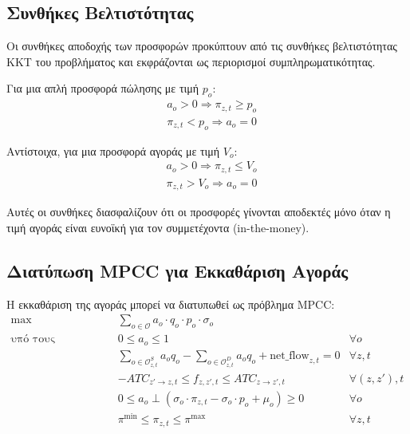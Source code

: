 \subsection{Συνθήκες Βελτιστότητας}
\label{subsec:euphemia-optimality}

Οι συνθήκες αποδοχής των προσφορών προκύπτουν από τις συνθήκες βελτιστότητας KKT του προβλήματος και εκφράζονται ως περιορισμοί συμπληρωματικότητας.

Για μια απλή προσφορά πώλησης με τιμή $p_o$:
\begin{equation}
\label{eq:supply-acceptance}
\begin{aligned}
& a_o > 0 \Rightarrow \pi_{z,t} \geq p_o \\
& \pi_{z,t} < p_o \Rightarrow a_o = 0
\end{aligned}
\end{equation}

Αντίστοιχα, για μια προσφορά αγοράς με τιμή $V_o$:
\begin{equation}
\label{eq:demand-acceptance}
\begin{aligned}
& a_o > 0 \Rightarrow \pi_{z,t} \leq V_o \\
& \pi_{z,t} > V_o \Rightarrow a_o = 0
\end{aligned}
\end{equation}

Αυτές οι συνθήκες διασφαλίζουν ότι οι προσφορές γίνονται αποδεκτές μόνο όταν η τιμή αγοράς είναι ευνοϊκή για τον συμμετέχοντα (in-the-money).

\subsection{Διατύπωση MPCC για Εκκαθάριση Αγοράς}
\label{subsec:euphemia-mpcc-formulation}

Η εκκαθάριση της αγοράς μπορεί να διατυπωθεί ως πρόβλημα MPCC:
\begin{equation}
\label{eq:market-clearing-mpcc}
\begin{aligned}
\max \quad & \sum_{o \in \mathcal{O}} a_o \cdot q_o \cdot p_o \cdot \sigma_o \\
\text{υπό τους περιορισμούς:} \quad
& 0 \leq a_o \leq 1 & \forall o \\
& \sum_{o \in \mathcal{O}_{z,t}^S} a_o q_o - \sum_{o \in \mathcal{O}_{z,t}^D} a_o q_o + \text{net\_flow}_{z,t} = 0 & \forall z, t \\
& -ATC_{z' \rightarrow z, t} \leq f_{z, z', t} \leq ATC_{z \rightarrow z', t} & \forall (z, z'), t \\
& 0 \leq a_o \perp (\sigma_o \cdot \pi_{z,t} - \sigma_o \cdot p_o + \mu_o) \geq 0 & \forall o \\
& \pi^{\min} \leq \pi_{z,t} \leq \pi^{\max} & \forall z, t
\end{aligned}
\end{equation}

